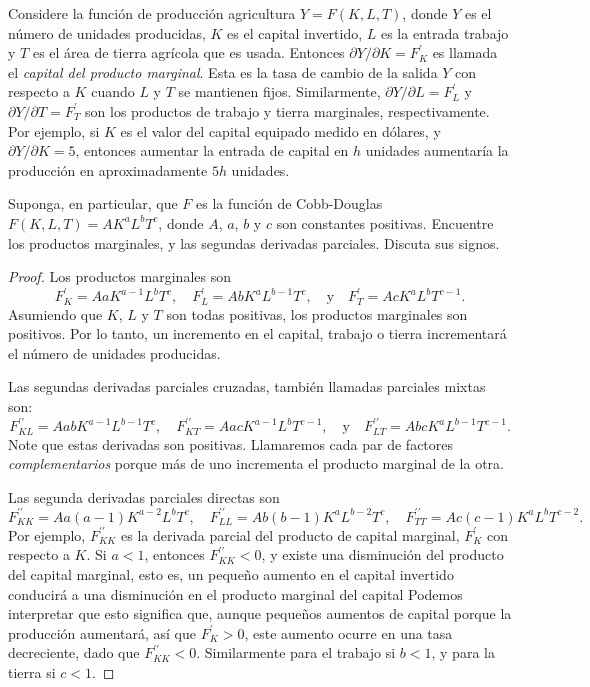 \begin{frame}[t]

\begin{example}
Considere la función de producción agricultura $Y=F\left(K,L,T\right)$, donde $Y$ es el número de unidades producidas, $K$ es el capital invertido, $L$ es la entrada trabajo y $T$ es el área de tierra agrícola que es usada. Entonces $\partial Y/\partial K=F^{\prime}_{K}$ es llamada el \emph{capital del producto marginal}. Esta es la tasa de cambio de la salida $Y$ con respecto a $K$ cuando $L$ y $T$ se mantienen fijos. Similarmente, $\partial Y/\partial L=F^{\prime}_{L}$ y $\partial Y/\partial T=F^{\prime}_{T}$ son los productos de trabajo y tierra marginales, respectivamente. Por ejemplo, si $K$ es el valor del capital equipado medido en dólares, y $\partial Y/\partial K=5$, entonces aumentar la entrada de capital en $h$ unidades aumentaría la producción en aproximadamente $5h$ unidades.

Suponga, en particular, que $F$ es la función de Cobb-Douglas $F\left(K,L,T\right)=AK^{a}L^{b}T^{c}$, donde $A$, $a$, $b$ y $c$ son constantes positivas. Encuentre los productos marginales, y las segundas derivadas parciales. Discuta sus signos.
\end{example}

\begin{proof}
Los productos marginales son \[ F^{\prime}_{K}=AaK^{a-1}L^{b}T^{c},\quad F^{\prime}_{L}=AbK^{a}L^{b-1}T^{c},\quad\text{y}\quad F^{\prime}_{T}=AcK^{a}L^{b}T^{c-1}. \] Asumiendo que $K$, $L$ y $T$ son todas positivas, los productos marginales son positivos. Por lo tanto, un incremento en el capital, trabajo o tierra incrementará el número de unidades producidas.

Las segundas derivadas parciales cruzadas, también llamadas parciales mixtas son: \[ F^{\prime\prime}_{KL}=AabK^{a-1}L^{b-1}T^{c},\quad F^{\prime\prime}_{KT}=AacK^{a-1}L^{b}T^{c-1},\quad\text{y}\quad F^{\prime\prime}_{LT}=AbcK^{a}L^{b-1}T^{c-1}. \] Note que estas derivadas son positivas. Llamaremos cada par de factores \emph{complementarios} porque más de uno incrementa el producto marginal de la otra.

Las segunda derivadas parciales directas son \[ F^{\prime\prime}_{KK}=Aa\left(a-1\right)K^{a-2}L^{b}T^{c},\quad F^{\prime\prime}_{LL}=Ab\left(b-1\right)K^{a}L^{b-2}T^{c},\quad F^{\prime\prime}_{TT}=Ac\left(c-1\right)K^{a}L^{b}T^{c-2}. \] Por ejemplo, $F^{\prime\prime}_{KK}$ es la derivada parcial del producto de capital marginal, $F^{\prime}_{K}$ con respecto a $K$. Si $a<1$, entonces $F^{\prime\prime}_{KK}<0$, y existe una disminución del producto del capital marginal, esto es, un pequeño aumento en el capital invertido conducirá a una disminución en el producto marginal del capital Podemos interpretar que esto significa que, aunque pequeños aumentos de capital porque la producción aumentará, así que $F^{\prime}_{K}>0$, este aumento ocurre en una tasa decreciente, dado que $F^{\prime\prime}_{KK}<0$. Similarmente para el trabajo si $b<1$, y para la tierra si $c<1$.
\end{proof}
\end{frame}

